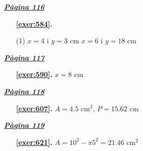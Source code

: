  \vspace{1cm} 
 

\vspace{0.3cm}


\hyperlink{page.116}{\textbf{\em Pàgina 116}}
\begin{enumerate}



 \item[\fontfamily{phv}\selectfont\color{blue}\textbf{\ref{exer:584}. }] \label{ans:584}
 \begin{tasks}[column-sep=1em, item-indent=1.3333em](1)
	 \task $x=4$ i $y=3$ cm
	 \task $x=6$ i $y=18$ cm
\end{tasks}
 \end{enumerate}
\vspace{0.3cm}


\hyperlink{page.117}{\textbf{\em Pàgina 117}}
\begin{enumerate}
\item[\fontfamily{phv}\selectfont\color{blue}\textbf{\ref{exer:590}. }] \label{ans:590} 
$x=8$ cm
 \end{enumerate}
\vspace{0.3cm}


\hyperlink{page.118}{\textbf{\em Pàgina 118}}
\begin{enumerate}
\item[\fontfamily{phv}\selectfont\color{blue}\textbf{\ref{exer:607}. }] \label{ans:607} 
$A=4.5$ cm$^2$, $P=15.62$ cm
 \end{enumerate}
\vspace{0.3cm}


\hyperlink{page.119}{\textbf{\em Pàgina 119}}
\begin{enumerate}
\item[\fontfamily{phv}\selectfont\color{blue}\textbf{\ref{exer:621}. }] \label{ans:621} 
$A=10^2-\pi 5^2=21.46$ cm$^2$
 \end{enumerate}
\vspace{0.3cm}


